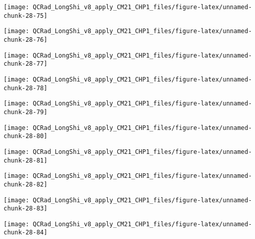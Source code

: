 \documentclass[
  10pt,
  a4paper,oneside]{article}
\begin{document}
\begin{center}\texttt{[image: QCRad\_LongShi\_v8\_apply\_CM21\_CHP1\_files/figure-latex/unnamed-chunk-28-75]} \end{center}

\begin{center}\texttt{[image: QCRad\_LongShi\_v8\_apply\_CM21\_CHP1\_files/figure-latex/unnamed-chunk-28-76]} \end{center}

\begin{center}\texttt{[image: QCRad\_LongShi\_v8\_apply\_CM21\_CHP1\_files/figure-latex/unnamed-chunk-28-77]} \end{center}

\begin{center}\texttt{[image: QCRad\_LongShi\_v8\_apply\_CM21\_CHP1\_files/figure-latex/unnamed-chunk-28-78]} \end{center}

\begin{center}\texttt{[image: QCRad\_LongShi\_v8\_apply\_CM21\_CHP1\_files/figure-latex/unnamed-chunk-28-79]} \end{center}

\begin{center}\texttt{[image: QCRad\_LongShi\_v8\_apply\_CM21\_CHP1\_files/figure-latex/unnamed-chunk-28-80]} \end{center}

\begin{center}\texttt{[image: QCRad\_LongShi\_v8\_apply\_CM21\_CHP1\_files/figure-latex/unnamed-chunk-28-81]} \end{center}

\begin{center}\texttt{[image: QCRad\_LongShi\_v8\_apply\_CM21\_CHP1\_files/figure-latex/unnamed-chunk-28-82]} \end{center}

\begin{center}\texttt{[image: QCRad\_LongShi\_v8\_apply\_CM21\_CHP1\_files/figure-latex/unnamed-chunk-28-83]} \end{center}

\begin{center}\texttt{[image: QCRad\_LongShi\_v8\_apply\_CM21\_CHP1\_files/figure-latex/unnamed-chunk-28-84]} \end{center}
\end{document}
